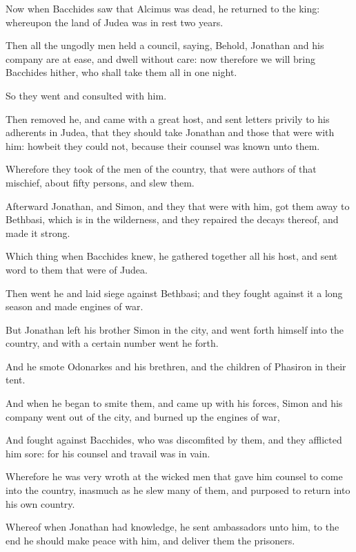 {\par }{\PP {}Now when Bacchides saw that Alcimus was dead, he returned to the king: whereupon the land of Judea was in rest two years.
\par }{\PP {}Then all the ungodly men held a council, saying, Behold, Jonathan and his company are at ease, and dwell without care: now therefore we will bring Bacchides hither, who shall take them all in one night.
\par }{\PP {}So they went and consulted with him.
\par }{\PP {}Then removed he, and came with a great host, and sent letters privily to his adherents in Judea, that they should take Jonathan and those that were with him: howbeit they could not, because their counsel was known unto them.
\par }{\PP {}Wherefore they took of the men of the country, that were authors of that mischief, about fifty persons, and slew them.
\par }{\PP {}Afterward Jonathan, and Simon, and they that were with him, got them away to Bethbasi, which is in the wilderness, and they repaired the decays thereof, and made it strong.
\par }{\PP {}Which thing when Bacchides knew, he gathered together all his host, and sent word to them that were of Judea.
\par }{\PP {}Then went he and laid siege against Bethbasi; and they fought against it a long season and made engines of war.
\par }{\PP {}But Jonathan left his brother Simon in the city, and went forth himself into the country, and with a certain number went he forth.
\par }{\PP {}And he smote Odonarkes and his brethren, and the children of Phasiron in their tent.
\par }{\PP {}And when he began to smite them, and came up with his forces, Simon and his company went out of the city, and burned up the engines of war,
\par }{\PP {}And fought against Bacchides, who was discomfited by them, and they afflicted him sore: for his counsel and travail was in vain.
\par }{\PP {}Wherefore he was very wroth at the wicked men that gave him counsel to come into the country, inasmuch as he slew many of them, and purposed to return into his own country.
\par }{\PP {}Whereof when Jonathan had knowledge, he sent ambassadors unto him, to the end he should make peace with him, and deliver them the prisoners.
}
